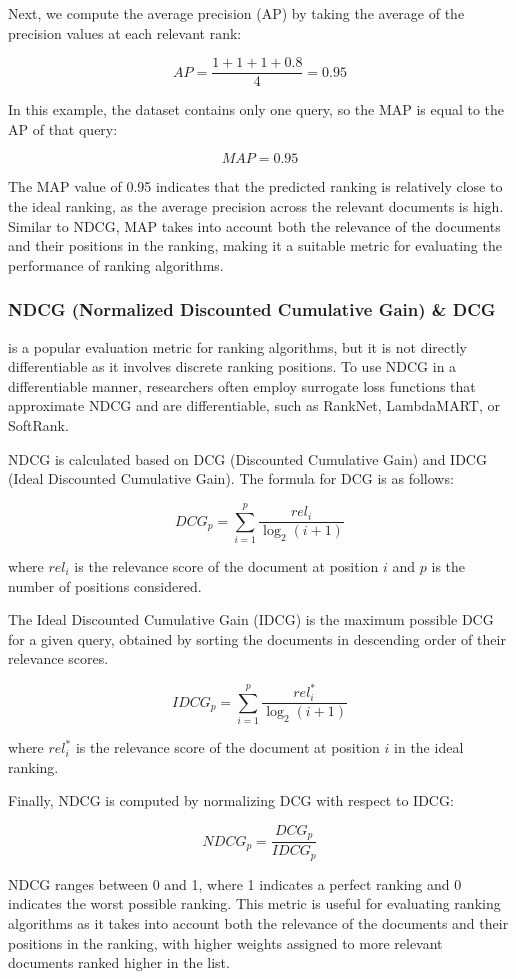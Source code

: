 \documentclass[12pt]{article}
\begin{document}
Next, we compute the average precision (AP) by taking the average of the precision values at each relevant rank:

$$AP = \frac{1 + 1 + 1 + 0.8}{4} = 0.95$$

In this example, the dataset contains only one query, so the MAP is equal to the AP of that query:

$$MAP = 0.95$$

The MAP value of 0.95 indicates that the predicted ranking is relatively close to the ideal ranking, as the average precision across the relevant documents is high. Similar to NDCG, MAP takes into account both the relevance of the documents and their positions in the ranking, making it a suitable metric for evaluating the performance of ranking algorithms.

\subsubsection{NDCG (Normalized Discounted Cumulative Gain) \& DCG} is a popular evaluation metric for ranking algorithms, but it is not directly differentiable as it involves discrete ranking positions. To use NDCG in a differentiable manner, researchers often employ surrogate loss functions that approximate NDCG and are differentiable, such as RankNet, LambdaMART, or SoftRank.

NDCG is calculated based on DCG (Discounted Cumulative Gain) and IDCG (Ideal Discounted Cumulative Gain). The formula for DCG is as follows:

$$DCG_p = \sum_{i=1}^p \frac{rel_i}{\log_2{(i + 1)}}$$

where $rel_i$ is the relevance score of the document at position $i$ and $p$ is the number of positions considered.

The Ideal Discounted Cumulative Gain (IDCG) is the maximum possible DCG for a given query, obtained by sorting the documents in descending order of their relevance scores.

$$IDCG_p = \sum_{i=1}^p \frac{rel^*_i}{\log_2{(i + 1)}}$$

where $rel^*_i$ is the relevance score of the document at position $i$ in the ideal ranking.

Finally, NDCG is computed by normalizing DCG with respect to IDCG:

$$NDCG_p = \frac{DCG_p}{IDCG_p}$$

NDCG ranges between 0 and 1, where 1 indicates a perfect ranking and 0 indicates the worst possible ranking. This metric is useful for evaluating ranking algorithms as it takes into account both the relevance of the documents and their positions in the ranking, with higher weights assigned to more relevant documents ranked higher in the list.
\end{document}
